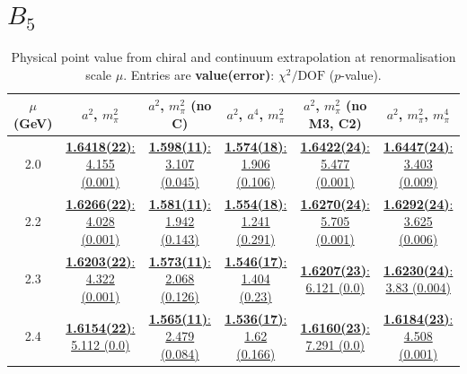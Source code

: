 \documentclass[12pt]{extarticle}
\begin{document}
\section{$B_5$}
\begin{table}[h!]
\begin{center}
\begin{tabular}{|c|c|c|c|c|c|}
\hline
$\mu$ (GeV) & $a^2$, $m_\pi^2$& $a^2$, $m_\pi^2$ (no C)& $a^2$, $a^4$, $m_\pi^2$& $a^2$, $m_\pi^2$ (no M3, C2)& $a^2$, $m_\pi^2$, $m_\pi^4$\\
\hline
2.0& \hyperlink{TT/SUSY_F/a2m2_20.pdf.1}{\textbf{1.6418(22)}: 4.155 (0.001)} & \hyperlink{TT/SUSY_F/a2m2noC_20.pdf.1}{\textbf{1.598(11)}: 3.107 (0.045)} & \hyperlink{TT/SUSY_F/a2a4m2_20.pdf.1}{\textbf{1.574(18)}: 1.906 (0.106)} & \hyperlink{TT/SUSY_F/a2m2mcut_20.pdf.1}{\textbf{1.6422(24)}: 5.477 (0.001)} & \hyperlink{TT/SUSY_F/a2m2m4_20.pdf.1}{\textbf{1.6447(24)}: 3.403 (0.009)}\\
2.2& \hyperlink{TT/SUSY_F/a2m2_22.pdf.1}{\textbf{1.6266(22)}: 4.028 (0.001)} & \hyperlink{TT/SUSY_F/a2m2noC_22.pdf.1}{\textbf{1.581(11)}: 1.942 (0.143)} & \hyperlink{TT/SUSY_F/a2a4m2_22.pdf.1}{\textbf{1.554(18)}: 1.241 (0.291)} & \hyperlink{TT/SUSY_F/a2m2mcut_22.pdf.1}{\textbf{1.6270(24)}: 5.705 (0.001)} & \hyperlink{TT/SUSY_F/a2m2m4_22.pdf.1}{\textbf{1.6292(24)}: 3.625 (0.006)}\\
2.3& \hyperlink{TT/SUSY_F/a2m2_23.pdf.1}{\textbf{1.6203(22)}: 4.322 (0.001)} & \hyperlink{TT/SUSY_F/a2m2noC_23.pdf.1}{\textbf{1.573(11)}: 2.068 (0.126)} & \hyperlink{TT/SUSY_F/a2a4m2_23.pdf.1}{\textbf{1.546(17)}: 1.404 (0.23)} & \hyperlink{TT/SUSY_F/a2m2mcut_23.pdf.1}{\textbf{1.6207(23)}: 6.121 (0.0)} & \hyperlink{TT/SUSY_F/a2m2m4_23.pdf.1}{\textbf{1.6230(24)}: 3.83 (0.004)}\\
2.4& \hyperlink{TT/SUSY_F/a2m2_24.pdf.1}{\textbf{1.6154(22)}: 5.112 (0.0)} & \hyperlink{TT/SUSY_F/a2m2noC_24.pdf.1}{\textbf{1.565(11)}: 2.479 (0.084)} & \hyperlink{TT/SUSY_F/a2a4m2_24.pdf.1}{\textbf{1.536(17)}: 1.62 (0.166)} & \hyperlink{TT/SUSY_F/a2m2mcut_24.pdf.1}{\textbf{1.6160(23)}: 7.291 (0.0)} & \hyperlink{TT/SUSY_F/a2m2m4_24.pdf.1}{\textbf{1.6184(23)}: 4.508 (0.001)}\\
\hline
\end{tabular}
\caption{Physical point value from chiral and continuum extrapolation at renormalisation scale $\mu$. Entries are \textbf{value(error)}: $\chi^2/\text{DOF}$ ($p$-value).}
\end{center}
\end{table}
\end{document}
